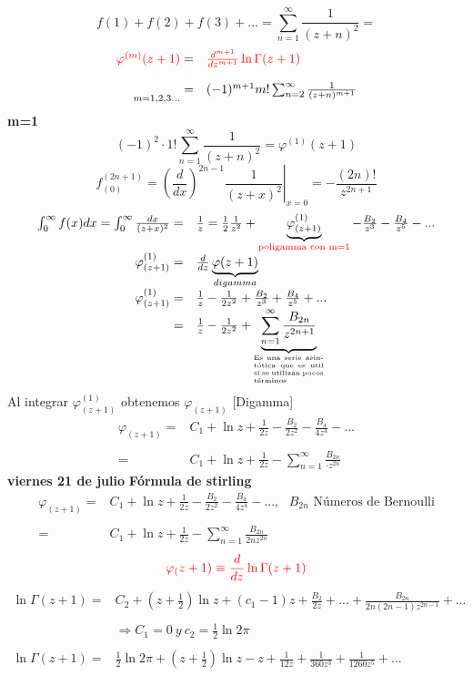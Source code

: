 \documentclass{article}
\theoremstyle{definition}
\begin{document}
\[f(1)+f(2)+f(3)+...=\sum^{\infty}_{n=1}\frac{1}{(z+n)^2}=\]
\[
\begin{array}{rl}
	\textcolor{red}{\varphi^{(m)}(z+1)}=&\textcolor{red}{\frac{d^{m+1}}{dz^{m+1}}\ln \Gamma (z+1)}\\
	\\
	\underset{m=1,2,3...}{ }=& (-1)^{m+1}m!\sum^{\infty}_{n=2}\frac{1}{(z+n)^{m+1}}
\end{array}
\]
\textbf{m=1}
\[(-1)^2\cdot 1!\sum^{\infty}_{n=1}\frac{1}{(z+n)^2}=\varphi^{(1)}(z+1)\]
\[f^{(2n+1)}_{(0)}=\left.\left(\frac{d}{dx}\right)^{2n-1}\frac{1}{(z+x)^2}\right|_{x=0}=-\frac{(2n)!}{z^{2n+1}}\]
\[
\begin{array}{rl}
	\int^{\infty}_0f(x)dx=\int^{\infty}_0\frac{dx}{(z+x)^2}=&\frac{1}{z}=\frac{1}{2}\frac{1}{z^2}+\underbrace{\varphi ^{(1)}_{(z+1)}}_{\textcolor{red}{\text{poligamma con m=1}}}-\frac{B_2}{z^3}-\frac{B_4}{z^5}-...\\
	\varphi ^{(1)}_{(z+1)}=& \frac{d}{dz}\underbrace{\varphi (z+1)}_{digamma}\\
	\varphi ^{(1)}_{(z+1)}=&\frac{1}{z}-\frac{1}{2z^2}+\frac{B_2}{z^3}+\frac{B_4}{z^5}+...\\
	=& \frac{1}{z}-\frac{1}{2z^2}+\underbrace{\sum^{\infty}_{n=1}\frac{B_{2n}}{z^{2n+1}}}_{\parbox{5.5em}{\tiny Es una serie asintótica que es util si se utilizan pocos términos}}
\end{array}\]
Al integrar $\varphi ^{(1)}_{(z+1)}$ obtenemos $\varphi _{(z+1)}$ [Digamma]
\[
\begin{array}{rl}
	\varphi_{(z+1)}=& C_1+\ln z+\frac{1}{2z}-\frac{B_2}{2z^2}-\frac{B_4}{4z^4}-...\\
	\\
	=& C_1+\ln z+\frac{1}{2z}-\sum\limits^{\infty}_{n=1}\frac{B_{2n}}{\cdot z^{2n}}
\end{array}
\]
\newpage
\textbf{viernes 21 de julio}
\textbf{Fórmula de stirling}
\[
\begin{array}{rl}
	\varphi_{(z+1)}=& C_1 +\ln z+ \frac{1}{2z}-\frac{B_2}{2z^2}-\frac{B_4}{4z^4}-...,\ \ \ B_{2n} \text{ Números de Bernoulli}\\
	\\
	=& C_1 +\ln z+ \frac{1}{2z}-\sum\limits^{\infty}_{n=1}\frac{B_{2n}}{2nz^{2n}}
\end{array}
\]
\[\textcolor{red}{\varphi_(z+1)\equiv \frac{d}{dz} \ln \Gamma (z+1)}\]
\[
\begin{array}{rl}
	\ln \Gamma (z+1) =& C_2 +\left(z+\frac{1}{2}\right) \ln z + (c_1-1)z+\frac{B_2}{2z}+...+ \frac{B_{2n}}{2n(2n-1)z^{2n-1}}+...\\
	\\
	&\Rightarrow C_1=0\ y \ c_2=\frac{1}{2}\ln 2\pi\\
	\\
	\ln \Gamma (z+1) =&\frac{1}{2} \ln 2\pi + \left(z+\frac{1}{2}\right) \ln z -z+\frac{1}{12z}+\frac{1}{360z^3}+\frac{1}{1260z^5}+...\\
\end{array}
\]
\end{document}
